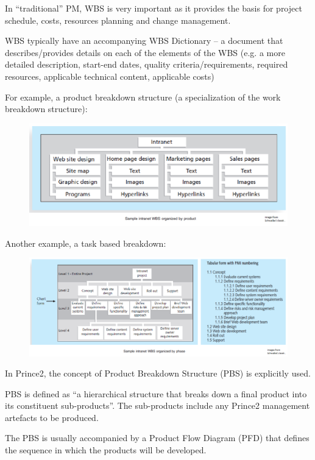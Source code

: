 \documentclass[]{project_plan}
\begin{document}
In “traditional” PM, WBS is very important as it provides the basis for project schedule, costs,
resources planning and change management.

WBS typically have an accompanying WBS Dictionary – a document that describes/provides
details on each of the elements of the WBS (e.g. a more detailed description, start-end dates,
quality criteria/requirements, required resources, applicable technical content, applicable costs)

\newpage

For example, a product breakdown structure (a specialization of the work breakdown structure):
\begin{figure}[h!]
  \centering
  \includegraphics[width=\linewidth]{product_breakdown_structure.png}
\end{figure}

Another example, a task based breakdown:
\begin{figure}[h!]
  \centering
  \includegraphics[width=\linewidth]{task_based_breakdown.png}
\end{figure}

In Prince2, the concept of Product Breakdown Structure (PBS) is explicitly used.

PBS is defined as “a hierarchical structure that breaks down a final product into its
constituent sub-products”. The sub-products include any Prince2 management artefacts to
be produced.

The PBS is usually accompanied by a Product Flow Diagram (PFD) that defines the
sequence in which the products will be developed.
\end{document}
